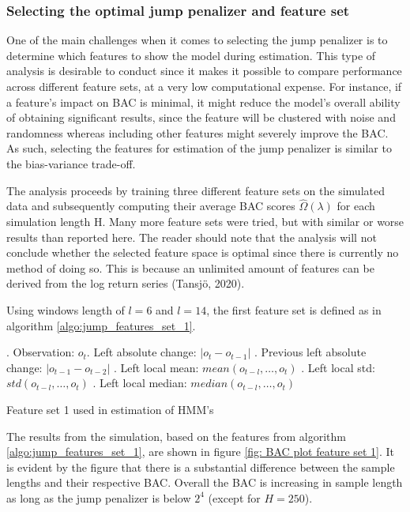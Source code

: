 \subsubsection{Selecting the optimal jump penalizer and feature set}
\label{subsubsection: optimal jump penalizer}
One of the main challenges when it comes to selecting the jump penalizer is to determine which features to show the model during estimation. This type of analysis is desirable to conduct since it makes it possible to compare performance across different feature sets, at a very low computational expense. For instance, if a feature's impact on BAC is minimal, it might reduce the model's overall ability of obtaining significant results, since the feature will be clustered with noise and randomness whereas including other features might severely improve the BAC. As such, selecting the features for estimation of the jump penalizer is similar to the bias-variance trade-off.  

The analysis proceeds by training three different feature sets on the simulated data and subsequently computing their average BAC scores $\hat\Omega(\lambda)$ for each simulation length H. Many more feature sets were tried, but with similar or worse results than reported here. The reader should note that the analysis will not conclude whether the selected feature space is optimal since there is currently no method of doing so. This is because an unlimited amount of features can be derived from the log return series (Tansjö, 2020). 

Using windows length of $l = 6$ and $l = 14$, the first feature set is defined as in algorithm \ref{algo:jump_features_set_1}. 

\begin{algorithm}[H]
. Observation: $o_t$. Left absolute change: $|o_t-o_{t-1}|$ . Previous left absolute change: $|o_{t-1}-o_{t-2}|$ . Left local mean: $mean(o_{t-l},\ldots,o_{t})$ . Left local std: $std(o_{t-l},\ldots, o_{t})$ . Left local median: $median(o_{t-l},\ldots,o_{t})$ \;
\BlankLine

\caption{Feature set 1 used in \jump estimation of HMM's}
\label{algo:jump_features_set_1}
\end{algorithm}

The results from the simulation, based on the features from algorithm \ref{algo:jump_features_set_1}, are shown in figure \ref{fig: BAC plot feature set 1}. It is evident by the figure that there is a substantial difference between the sample lengths and their respective BAC. Overall the BAC is increasing in sample length as long as the jump penalizer is below $2^4$ (except for $H=250$).

